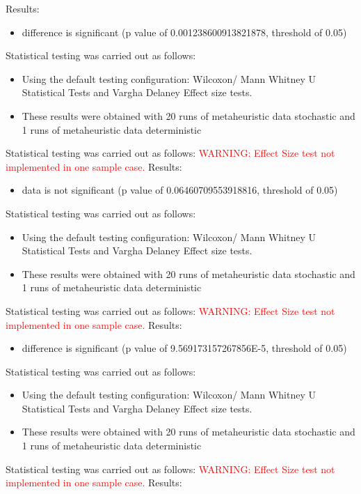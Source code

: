 \documentclass[]{article}
\begin{document}
Results:
\begin{itemize}
\item{difference is significant (p value of 0.001238600913821878, threshold of 0.05)}
\end{itemize}Statistical testing was carried out as follows: \begin{itemize}
\item{Using the default testing configuration: Wilcoxon/ Mann Whitney U Statistical Tests and Vargha Delaney Effect size tests.}
\item{These results were obtained with 20 runs of metaheuristic data stochastic and 1 runs of metaheuristic data deterministic}
\end{itemize}Statistical testing was carried out as follows: 
\textcolor{Red}{WARNING: Effect Size test not implemented in one sample case.
}
Results:
\begin{itemize}
\item{data is not significant (p value of 0.06460709553918816, threshold of 0.05)}
\end{itemize}Statistical testing was carried out as follows: \begin{itemize}
\item{Using the default testing configuration: Wilcoxon/ Mann Whitney U Statistical Tests and Vargha Delaney Effect size tests.}
\item{These results were obtained with 20 runs of metaheuristic data stochastic and 1 runs of metaheuristic data deterministic}
\end{itemize}Statistical testing was carried out as follows: 
\textcolor{Red}{WARNING: Effect Size test not implemented in one sample case.
}
Results:
\begin{itemize}
\item{difference is significant (p value of 9.569173157267856E-5, threshold of 0.05)}
\end{itemize}Statistical testing was carried out as follows: \begin{itemize}
\item{Using the default testing configuration: Wilcoxon/ Mann Whitney U Statistical Tests and Vargha Delaney Effect size tests.}
\item{These results were obtained with 20 runs of metaheuristic data stochastic and 1 runs of metaheuristic data deterministic}
\end{itemize}Statistical testing was carried out as follows: 
\textcolor{Red}{WARNING: Effect Size test not implemented in one sample case.
}
Results:
\end{document}
